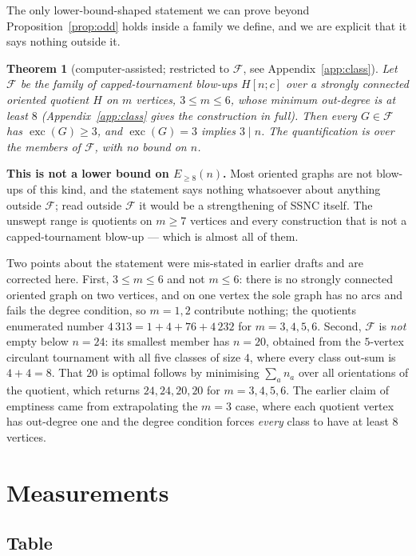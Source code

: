 \documentclass[11pt]{amsart}
\newtheorem{theorem}{Theorem}[section]
\theoremstyle{remark}
\newcommand{\exc}{\operatorname{exc}}
\begin{document}
The only lower-bound-shaped statement we can prove beyond
Proposition~\ref{prop:odd} holds inside a family we define, and we are
explicit that it says nothing outside it.

\begin{theorem}[computer-assisted; restricted to $\mathcal{F}$, see
Appendix~\ref{app:class}]\label{thm:class}
Let $\mathcal{F}$ be the family of capped-tournament blow-ups $H[n; c]$ over a
strongly connected oriented quotient $H$ on $m$ vertices, $3 \le m \le 6$,
whose minimum out-degree is at least $8$ (Appendix~\ref{app:class} gives the
construction in full). Then every $G \in \mathcal{F}$ has $\exc(G) \ge 3$,
and $\exc(G) = 3$ implies $3 \mid n$. The quantification is over the members
of $\mathcal{F}$, with no bound on $n$.
\end{theorem}

\textbf{This is not a lower bound on $E_{\ge 8}(n)$.} Most oriented
graphs are not blow-ups of this kind, and the statement says nothing
whatsoever about anything outside $\mathcal{F}$; read outside $\mathcal{F}$ it
would be a strengthening of SSNC itself. The unswept range is quotients on
$m \ge 7$ vertices and every construction that is not a capped-tournament
blow-up --- which is almost all of them.

Two points about the statement were mis-stated in earlier drafts and are
corrected here. First, $3 \le m \le 6$ and not $m \le 6$: there is no strongly
connected oriented graph on two vertices, and on one vertex the sole graph has
no arcs and fails the degree condition, so $m = 1, 2$ contribute nothing; the
quotients enumerated number $4\,313 = 1 + 4 + 76 + 4\,232$ for
$m = 3,4,5,6$. Second, $\mathcal{F}$ is \emph{not} empty below $n = 24$: its
smallest member has $n = 20$, obtained from the $5$-vertex circulant
tournament with all five classes of size $4$, where every class out-sum is
$4 + 4 = 8$. That $20$ is optimal follows by minimising $\sum_a n_a$ over all
orientations of the quotient, which returns $24, 24, 20, 20$ for
$m = 3,4,5,6$. The earlier claim of emptiness came from extrapolating the
$m = 3$ case, where each quotient vertex has out-degree one and the degree
condition forces \emph{every} class to have at least $8$ vertices.

\section{Measurements}\label{sec:measurements}

\subsection{Table}\label{sec:table}
\end{document}
